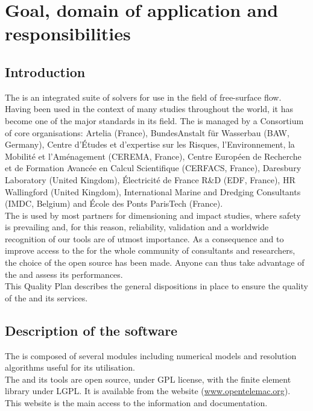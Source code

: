 \chapter{Goal, domain of application and responsibilities}

\section{Introduction}

The \telemacsystem{} is an integrated suite of solvers for use in the field of
free-surface flow. Having been used in the context of many studies throughout
the world, it has become one of the major standards in its field.
The \telemacsystem{} is managed by a Consortium of core organisations: Artelia
(France), BundesAnstalt für Wasserbau (BAW, Germany), Centre d’Études et
d'expertise sur les Risques, l'Environnement, la Mobilité et l'Aménagement
(CEREMA, France), Centre Européen de Recherche et de Formation Avancée en
Calcul Scientifique (CERFACS, France), Daresbury Laboratory (United Kingdom),
Électricité de France R\&D (EDF, France), HR Wallingford (United Kingdom),
International Marine and Dredging Consultants (IMDC, Belgium) and École des
Ponts ParisTech (France).\\

The \telemacsystem{} is used by most partners for dimensioning and impact
studies, where safety is prevailing and, for this reason, reliability,
validation and a worldwide recognition of our tools are of utmost importance.
As a consequence and to improve access to the \telemacsystem{} for the whole
community of consultants and researchers, the choice of the open source has
been made. Anyone can thus take advantage of the \telemacsystem{} and assess
its performances.\\

This Quality Plan describes the general dispositions in place to ensure the
quality of the \telemacsystem{} and its services.

\section{Description of the software}

The \telemacsystem{} is composed of several modules including numerical models
and resolution algorithms useful for its utilisation.\\

The \telemacsystem{} and its tools are open source, under GPL license, with the
\bief{} finite element library under LGPL\@. It is available from the
\telemacsystem{} website (\url{www.opentelemac.org}). This website is the main
access to the \telemacsystem{} information and documentation.\\


